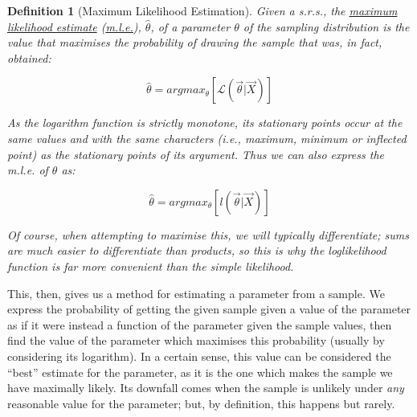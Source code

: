 \documentclass[12pt,a4paper]{article}
\newtheorem{defn}[thm]{Definition}
\begin{document}
\begin{defn}[Maximum Likelihood Estimation]\vspace{1cm}

Given a s.r.s., the \underline{maximum likelihood estimate} (\underline{m.l.e.}), $\hat{\theta}$, of a parameter $\theta$ of the sampling distribution is the value that maximises the probability of drawing the sample that was, in fact, obtained:

$$\hat{\theta} = argmax_\theta \left[\mathcal{L}\left(\vec{\theta} | \vec{X}\right)\right]$$

As the logarithm function is strictly monotone, its stationary points occur at the same values and with the same characters (i.e., maximum, minimum or inflected point) as the stationary points of its argument. Thus we can also express the m.l.e. of $\theta$ as:

$$\hat{\theta} = argmax_\theta \left[l\left(\vec{\theta} | \vec{X}\right)\right]$$

Of course, when attempting to maximise this, we will typically differentiate; sums are much easier to differentiate than products, so this is why the loglikelihood function is far more convenient than the simple likelihood.

\end{defn}

This, then, gives us a method for estimating a parameter from a sample. We express the probability of getting the given sample given a value of the parameter as if it were instead a function of the parameter given the sample values, then find the value of the parameter which maximises this probability (usually by considering its logarithm). In a certain sense, this value can be considered the ``best'' estimate for the parameter, as it is the one which makes the sample we have maximally likely. Its downfall comes when the sample is unlikely under \emph{any} reasonable value for the parameter; but, by definition, this happens but rarely.
\end{document}
